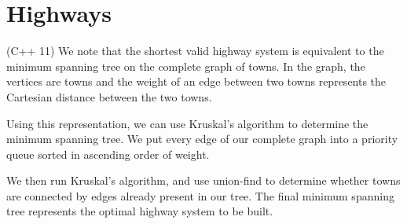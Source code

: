 \documentclass{article}
\begin{document}
\section{Highways}
(C++ 11) We note that the shortest valid highway system is equivalent to the minimum spanning tree on the complete graph of towns. In the graph, the vertices are towns and the weight of an edge between two towns represents the Cartesian distance between the two towns.
\par 
Using this representation, we can use Kruskal's algorithm to determine the minimum spanning tree. We put every edge of our complete graph into a priority queue sorted in ascending order of weight.
\par
We then run Kruskal's algorithm, and use union-find to determine whether towns are connected by edges already present in our tree. The final minimum spanning tree represents the optimal highway system to be built.
\end{document}
